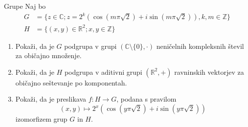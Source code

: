 \begin{frame}{Grupe}
	Naj bo
	\begin{align*}
		G &= \{z\in\mathbb{C}; z=2^k(\cos(m\pi\sqrt{2})+i\sin(m\pi\sqrt{2})), k,m\in\mathbb{Z}\} \\
		H &= \{(x,y)\in\mathbb{R}^2; x,y \in \mathbb{Z}\}
	\end{align*}
	\begin{enumerate}
		\item
			Pokaži, da je $G$ podgrupa v grupi \((\mathbb{C}\setminus\{0\},\cdot)\)
			neničelnih kompleksnih števil za običajno množenje.
		\item
			Pokaži, da je $H$ podgrupa v aditivni grupi \((\mathbb{R}^2,+)\)
			ravninskih vektorjev za običajno seštevanje po komponentah.
		\item
			Pokaži, da je preslikava $f:H\to G$, podana s pravilom
			\[(x,y)\mapsto 2^x(\cos(y\pi\sqrt{2})+i\sin(y\pi\sqrt{2}))\]
			izomorfizem grup $G$ in $H$.
	\end{enumerate}
\end{frame}
